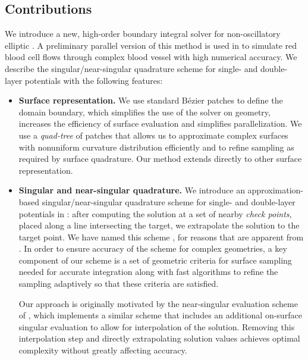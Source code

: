 \subsection{Contributions}
We introduce a new, high-order boundary integral solver for non-oscillatory elliptic \pdes. 
A preliminary parallel version of this method is used in \cite{lu2019scalable} to simulate red blood cell flows through complex blood vessel with high numerical accuracy.
We describe the 
singular/near-singular quadrature scheme for single- and double-layer potentials with the following features:
\begin{itemize}
\item {\bf Surface representation.} %
  We use standard B\'ezier patches to define the domain boundary, which simplifies the use of the solver on  geometry, increases the efficiency of surface evaluation and simplifies parallelization. 
        We use a \emph{quad-tree} of patches that allows us to approximate complex surfaces with nonuniform curvature distribution efficiently and to refine sampling as required by surface quadrature. 
   Our method extends directly to other surface representation.
  
\item {\bf Singular and near-singular quadrature.}
We introduce an approximation-based singular/near-singular quadrature scheme for single- and double-layer potentials in \threed: after computing the solution at a set of nearby \textit{check points}, placed along a line intersecting the target, we extrapolate the solution to the target point. 
We have named this scheme \qbkix, for reasons that are apparent from .
In order to ensure accuracy of the scheme for complex geometries, a key component of our scheme is a set of geometric criteria for surface sampling needed for accurate integration along with fast algorithms to refine the sampling adaptively so that these criteria are satisfied. 

Our approach is originally motivated by the near-singular evaluation scheme of \cite{YBZ,QB}, which implements a similar scheme that includes an additional on-surface singular evaluation to allow for interpolation of the solution. 
Removing this interpolation step and directly extrapolating solution values achieves optimal complexity without greatly affecting accuracy.


\end{itemize}
